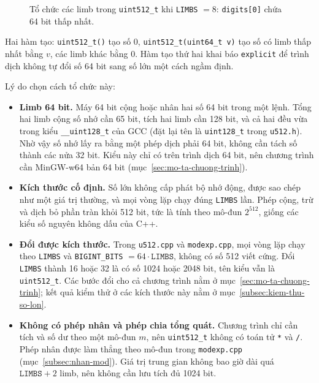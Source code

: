 \begin{figure}[h!]
\centering
{}
\caption{Tổ chức các limb trong \texttt{uint512\_t} khi \texttt{LIMBS} $= 8$: \texttt{digits[0]} chứa 64 bit thấp nhất.}
\label{fig:u512-structure}
\end{figure}

Hai hàm tạo: \texttt{uint512\_t()} tạo số 0, \texttt{uint512\_t(uint64\_t v)} tạo số có limb thấp nhất bằng $v$, các limb khác bằng 0. Hàm tạo thứ hai khai báo \texttt{explicit} để trình dịch không tự đổi số 64 bit sang số lớn một cách ngầm định.

Lý do chọn cách tổ chức này:
\begin{itemize}
    \item \textbf{Limb 64 bit.} Máy 64 bit cộng hoặc nhân hai số 64 bit trong một lệnh. Tổng hai limb cộng số nhớ cần 65 bit, tích hai limb cần 128 bit, và cả hai đều vừa trong kiểu \texttt{\_\_uint128\_t} của GCC (đặt lại tên là \texttt{uint128\_t} trong \texttt{u512.h}). Nhờ vậy số nhớ lấy ra bằng một phép dịch phải 64 bit, không cần tách số thành các nửa 32 bit. Kiểu này chỉ có trên trình dịch 64 bit, nên chương trình cần MinGW-w64 bản 64 bit (mục~\ref{sec:mo-ta-chuong-trinh}).
    \item \textbf{Kích thước cố định.} Số lớn không cấp phát bộ nhớ động, được sao chép như một giá trị thường, và mọi vòng lặp chạy đúng \texttt{LIMBS} lần. Phép cộng, trừ và dịch bỏ phần tràn khỏi 512 bit, tức là tính theo mô-đun $2^{512}$, giống các kiểu số nguyên không dấu của C++.
    \item \textbf{Đổi được kích thước.} Trong \texttt{u512.cpp} và \texttt{modexp.cpp}, mọi vòng lặp chạy theo \texttt{LIMBS} và \texttt{BIGINT\_BITS} $= 64 \cdot \texttt{LIMBS}$, không có số 512 viết cứng. Đổi \texttt{LIMBS} thành 16 hoặc 32 là có số 1024 hoặc 2048 bit, tên kiểu vẫn là \texttt{uint512\_t}. Các bước đổi cho cả chương trình nằm ở mục~\ref{sec:mo-ta-chuong-trinh}; kết quả kiểm thử ở các kích thước này nằm ở mục~\ref{subsec:kiem-thu-so-lon}.
    \item \textbf{Không có phép nhân và phép chia tổng quát.} Chương trình chỉ cần tích và số dư theo một mô-đun $m$, nên \texttt{uint512\_t} không có toán tử \texttt{*} và \texttt{/}. Phép nhân được làm thẳng theo mô-đun trong \texttt{modexp.cpp} (mục~\ref{subsec:nhan-mod}). Giá trị trung gian không bao giờ dài quá $\texttt{LIMBS} + 2$ limb, nên không cần lưu tích đủ 1024 bit.
\end{itemize}

